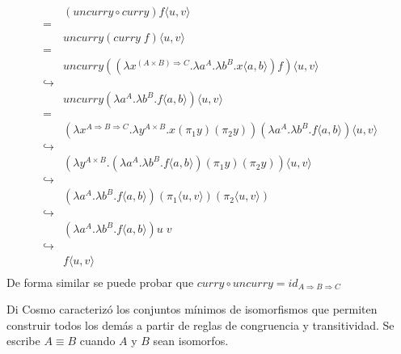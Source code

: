 \documentclass[]{report}
\begin{document}
	\begin{align*}
		 & (uncurry \circ curry) f \langle u,v \rangle \\
		=& \\
		 & uncurry (curry \; f) \langle u,v \rangle \\
		=& \\
		 & uncurry ((\lambda x^{(A \times B) \Rightarrow C}. \lambda a^A . \lambda b^B . x\langle a,b \rangle) f)  \langle u,v \rangle \\
		\hookrightarrow& \\
		 & uncurry (\lambda a^A . \lambda b^B . f\langle a,b \rangle)  \langle u,v \rangle \\
		=& \\
		 & (\lambda x^{A \Rightarrow B \Rightarrow C}. \lambda y^{A \times B} . x(\pi_1 y)(\pi_2 y)) (\lambda a^A . \lambda b^B . f\langle a,b \rangle)  \langle u,v \rangle \\
		\hookrightarrow& \\
		& (\lambda y^{A \times B} . (\lambda a^A . \lambda b^B . f\langle a,b \rangle)(\pi_1 y)(\pi_2 y)) \langle u,v \rangle \\
		\hookrightarrow& \\
		& (\lambda a^A . \lambda b^B . f\langle a,b \rangle)(\pi_1 \langle u,v \rangle)(\pi_2 \langle u,v \rangle) \\
		\hookrightarrow& \\
		& (\lambda a^A . \lambda b^B . f\langle a,b \rangle) u \; v \\
		\hookrightarrow& \\
		& f\langle u,v \rangle \\
	\end{align*}
	De forma similar se puede probar que $curry \circ uncurry = id_{A \Rightarrow B \Rightarrow C}$
	
	Di Cosmo \cite{MSCSSurvey05} caracterizó los conjuntos mínimos de isomorfismos que permiten construir todos los demás a partir de reglas de congruencia y transitividad.
	Se escribe $A \equiv B$ cuando $A$ y $B$ sean isomorfos.
	
\end{document}
